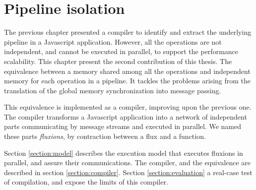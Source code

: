 \chapter{Pipeline isolation} \label{chapter5}

The previous chapter presented a compiler to identify and extract the underlying pipeline in a Javascript application.
However, all the operations are not independent, and cannot be executed in parallel, to support the performance scalability.
This chapter present the second contribution of this thesis.
The equivalence between a memory shared among all the operations and independent memory for each operation in a pipeline.
It tackles the problems arising from the translation of the global memory synchronization into message passing.

This equivalence is implemented as a compiler, improving upon the previous one.
The compiler transforms a Javascript application into a network of independent parts communicating by message streams and executed in parallel.
We named these parts \textit{fluxions}, by contraction between a flux and a function.

Section \ref{section:model} describes the execution model that executes fluxions in parallel, and assure their communications.
The compiler, and the equivalence are described in section \ref{section:compiler}.
Section \ref{section:evaluation} a real-case test of compilation, and expose the limits of this compiler.





